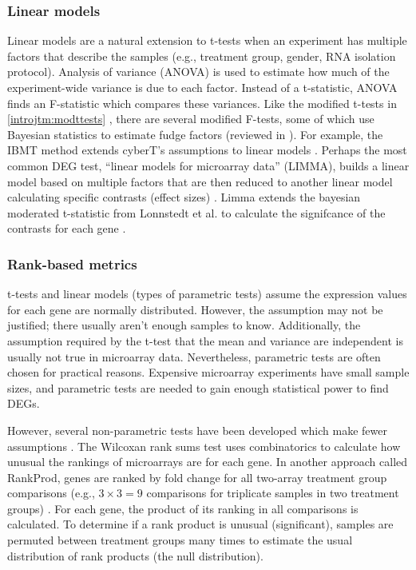 \subsubsection{Linear models}
Linear models are a natural extension to t-tests when an experiment
has multiple factors that describe the samples (e.g., treatment group,
gender, RNA isolation protocol). Analysis of variance (ANOVA) is
used to estimate how much of the experiment-wide variance is 
due to each factor. Instead of a t-statistic, ANOVA finds an F-statistic
which compares these variances. Like the modified t-tests 
in \ref{introjtm:modttests} , there are
several modified F-tests, some of which use Bayesian statistics to
estimate fudge factors (reviewed in \cite{Cui:2003vl}).
For example, the IBMT method extends cyberT's assumptions to
linear models \cite{Sartor:2006hw}.
Perhaps the most common DEG test, ``linear models for
microarray data'' (LIMMA), builds a linear model based on multiple
factors that are then reduced to another linear model calculating
specific contrasts (effect sizes) \cite{Smyth:2005ht,Smyth:2004gh}. Limma extends the bayesian moderated
t-statistic from Lonnstedt et al. to calculate the signifcance 
of the contrasts for each gene \cite{Lonnstedt:2002wu}.


\subsubsection{Rank-based metrics}
t-tests and linear models (types of parametric tests) assume
the expression values for each gene are normally distributed. However, the
assumption may not be justified; there usually aren't enough samples to know.
Additionally, the assumption required by the t-test
that the mean and variance are independent is usually not true in microarray data.
Nevertheless, parametric tests are often chosen
for practical reasons. Expensive microarray experiments have small sample sizes, and
parametric tests are needed to gain enough statistical power
to find DEGs.

However, several non-parametric tests have been developed which
make fewer assumptions \cite{Qi:2011tc}.
The Wilcoxan rank sums test uses combinatorics
to calculate how unusual the rankings of microarrays are for each gene.
In another approach called RankProd, genes are ranked by fold change for all
two-array treatment group comparisons (e.g., $3\times3=9$ comparisons for triplicate 
samples in two treatment groups) \cite{Breitling:2004te,Breitling:2005ue,Hong:2006gf}.
For each gene, the product of its ranking in all comparisons is calculated.
To determine if
a rank product is unusual (significant), samples are permuted
between treatment groups many times to estimate the
usual distribution of rank products (the null distribution).


